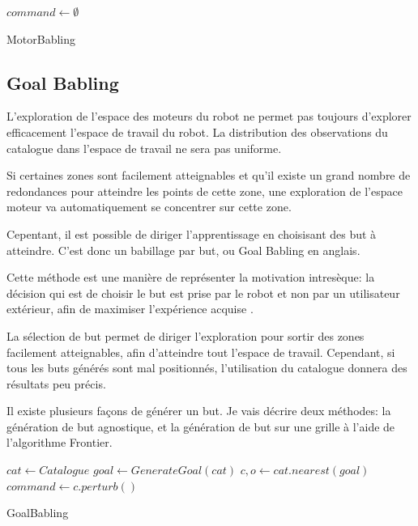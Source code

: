 \documentclass[11pt,french]{report}
\begin{document}
\begin{algorithm}[h]
    \DontPrintSemicolon
    \LinesNumbered
    $command \leftarrow \emptyset$ \;
    \caption{\label{alg:MotorBabling} MotorBabling}
\end{algorithm}

\subsection{Goal Babling}

L'exploration de l'espace des moteurs du robot ne permet pas toujours d'explorer efficacement l'espace de travail du robot.
La distribution des observations du catalogue dans l'espace de travail ne sera pas uniforme.

Si certaines zones sont facilement atteignables et qu'il existe un grand nombre de redondances pour atteindre les points de cette zone, une exploration de l'espace moteur va automatiquement se concentrer sur cette zone.

\phantom{INVISIBLE LINE}

Cepentant, il est possible de diriger l'apprentissage en choisisant des but à atteindre.
C'est donc un babillage par but, ou Goal Babling en anglais.

Cette méthode est une manière de représenter la motivation intresèque: la décision qui est de choisir le but est prise par le robot et non par un utilisateur extérieur, afin de maximiser l'expérience acquise \cite{Intrinsic_motivation}.

\phantom{INVISIBLE LINE}

La sélection de but permet de diriger l'exploration pour sortir des zones facilement atteignables, afin d'atteindre tout l'espace de travail.
Cependant, si tous les buts générés sont mal positionnés, l'utilisation du catalogue donnera des résultats peu précis.

Il existe plusieurs façons de générer un but.
Je vais décrire deux méthodes: la génération de but agnostique, et la génération de but sur une grille à l'aide de l'algorithme Frontier.

\begin{algorithm}[h]
    \DontPrintSemicolon
    \LinesNumbered
    $cat \leftarrow Catalogue$\;
    $goal \leftarrow GenerateGoal(cat)$ \;
    $c, o \leftarrow cat.nearest(goal)$ \;
    $command \leftarrow c.perturb()$ \;
    \caption{\label{alg:GoalBabling} GoalBabling}
\end{algorithm}
\end{document}
